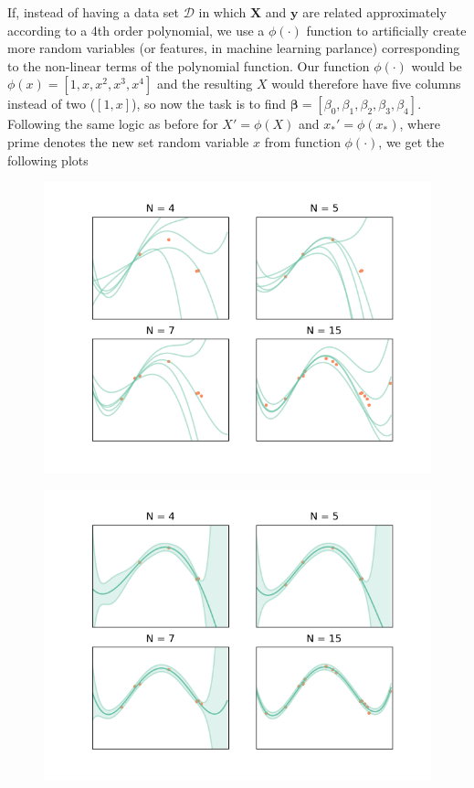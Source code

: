 \documentclass[]{article}
\begin{document}
If, instead of having a data set $\mathcal{D}$ in which $\boldsymbol{X}$ and $\boldsymbol{y}$ are related approximately according to a 4th order polynomial, we use a $\phi(\cdot)$ function to artificially create more random variables (or features, in machine learning parlance) corresponding to the non-linear terms of the polynomial function. Our function $\phi(\cdot)$ would be $\phi(x) = [1, x, x^2, x^3, x^4]$ and the resulting $X$ would therefore have five columns instead of two ($[1, x]$), so now the task is to find $\boldsymbol{\beta}=[\beta_0, \beta_1, \beta_2, \beta_3, \beta_4]$. Following the same logic as before for $X'=\phi(X)$ and $x_*'=\phi(x_*)$, where prime denotes the new set random variable $x$ from function $\phi(\cdot)$, we get the following plots

\begin{figure}
	\centering
	\includegraphics[width=0.9\linewidth]{poly_model.png}
	\caption{}
	\label{fig:polymodel}
\end{figure}

\begin{figure}
	\centering
	\includegraphics[width=0.9\linewidth]{poly_regression.png}
	\caption{}
	\label{fig:polyregression}
\end{figure}
\end{document}
